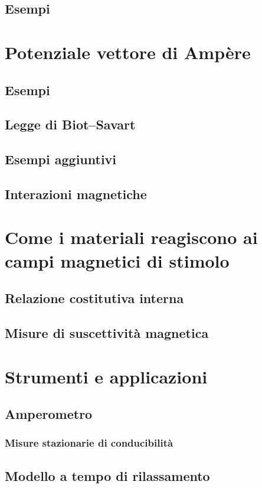 \documentclass{book}
\begin{document}
\section{Esempi}

\chapter{Potenziale vettore di Amp\`ere}
\section{Esempi}
\section{Legge di Biot--Savart}
\section{Esempi aggiuntivi}
\section{Interazioni magnetiche}

\chapter{Come i materiali reagiscono ai campi magnetici di stimolo}
\section{Relazione costitutiva interna}
\section{Misure di suscettivit\`a magnetica}

\chapter{Strumenti e applicazioni}
\section{Amperometro}
\subsection{Misure stazionarie di conducibilit\`a}
\section{Modello a tempo di rilassamento}
\end{document}
